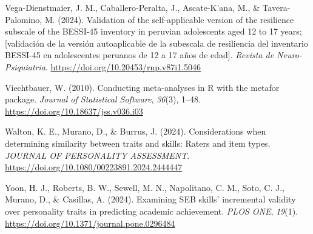 \documentclass[
  man,
  longtable,
  nolmodern,
  notxfonts,
  notimes,
  colorlinks=true,linkcolor=blue,citecolor=blue,urlcolor=blue]{apa7}
\newlength{\cslhangindent}
\newenvironment{CSLReferences}[2] %
 {\begin{list}{}{%
  \setlength{\itemindent}{0pt}
  \setlength{\leftmargin}{0pt}
  \setlength{\parsep}{0pt}
  \ifodd #1
   \setlength{\leftmargin}{\cslhangindent}
   \setlength{\itemindent}{-1\cslhangindent}
  \fi
  \setlength{\itemsep}{#2\baselineskip}}}
 {\end{list}}
\begin{document}
\begin{CSLReferences}{1}{0}
Vega-Dienstmaier, J. M., Caballero-Peralta, J., Ascate-K'ana, M., \&
Tavera-Palomino, M. (2024). Validation of the self-applicable version of
the resilience subscale of the BESSI-45 inventory in peruvian
adolescents aged 12 to 17 years; {[}validación de la versión
autoaplicable de la subescala de resiliencia del inventario BESSI-45 en
adolescentes peruanos de 12 a 17 años de edad{]}. \emph{Revista de
Neuro-Psiquiatria}. \url{https://doi.org/10.20453/rnp.v87i1.5046}

Viechtbauer, W. (2010). Conducting meta-analyses in R with the metafor
package. \emph{Journal of Statistical Software}, \emph{36}(3), 1--48.
\url{https://doi.org/10.18637/jss.v036.i03}

Walton, K. E., Murano, D., \& Burrus, J. (2024). Considerations when
determining similarity between traits and skills: Raters and item types.
\emph{JOURNAL OF PERSONALITY ASSESSMENT}.
\url{https://doi.org/10.1080/00223891.2024.2444447}

Yoon, H. J., Roberts, B. W., Sewell, M. N., Napolitano, C. M., Soto, C.
J., Murano, D., \& Casillas, A. (2024). Examining SEB skills'
incremental validity over personality traits in predicting academic
achievement. \emph{PLOS ONE}, \emph{19}(1).
\url{https://doi.org/10.1371/journal.pone.0296484}

\end{CSLReferences}
\end{document}
